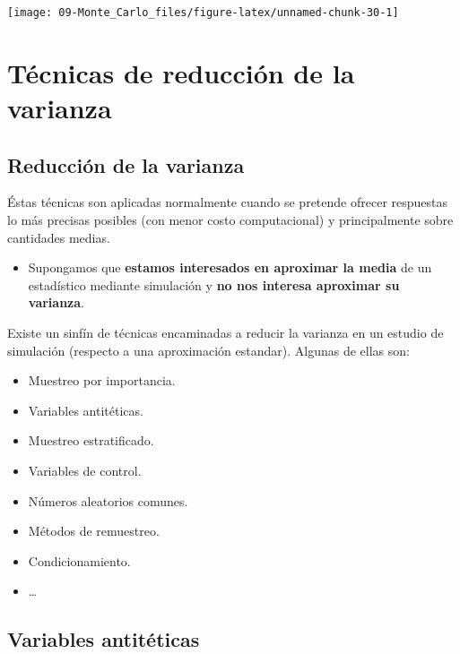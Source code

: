 \documentclass[]{book}
\providecommand{\tightlist}{%
  \setlength{\itemsep}{0pt}\setlength{\parskip}{0pt}}
\theoremstyle{definition}
\theoremstyle{definition}
\theoremstyle{definition}
\theoremstyle{remark}
\begin{document}
\begin{center}\texttt{[image: 09-Monte\_Carlo\_files/figure-latex/unnamed-chunk-30-1]} \end{center}

\chapter{Técnicas de reducción de la
varianza}\label{tecnicas-de-reduccion-de-la-varianza}

\section{Reducción de la varianza}\label{reduccion-de-la-varianza}

Éstas técnicas son aplicadas normalmente cuando se pretende ofrecer
respuestas lo más precisas posibles (con menor costo computacional) y
principalmente sobre cantidades medias.

\begin{itemize}
\tightlist
\item
  Supongamos que \textbf{estamos interesados en aproximar la media} de
  un estadístico mediante simulación y \textbf{no nos interesa aproximar
  su varianza}.
\end{itemize}

Existe un sinfín de técnicas encaminadas a reducir la varianza en un
estudio de simulación (respecto a una aproximación estandar). Algunas de
ellas son:

\begin{itemize}
\item
  Muestreo por importancia.
\item
  Variables antitéticas.
\item
  Muestreo estratificado.
\item
  Variables de control.
\item
  Números aleatorios comunes.
\item
  Métodos de remuestreo.
\item
  Condicionamiento.
\item
  \ldots{}
\end{itemize}

\section{Variables antitéticas}\label{variables-antiteticas}
\end{document}
